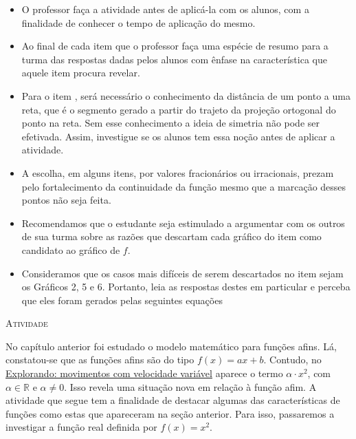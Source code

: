 \documentclass[10 pt,usenames,dvipsnames, oneside]{article}
\begin{document}
\begin{goals}
\begin{itemize}[itemsep=0pt]
\item O professor faça a atividade antes de aplicá-la com os alunos, com a finalidade de conhecer o tempo de aplicação do mesmo.
\item Ao final de cada item que o professor faça uma espécie de resumo para a turma das respostas dadas pelos alunos com ênfase na característica que aquele item procura revelar.
\item Para o item , será necessário o conhecimento da distância de um ponto a uma reta, que é o segmento gerado a partir do trajeto da projeção ortogonal do ponto na reta. Sem esse conhecimento a ideia de simetria não pode ser efetivada. Assim, investigue se os alunos tem essa noção antes de aplicar a atividade.
\item A escolha, em alguns itens, por valores fracionários ou irracionais, prezam pelo fortalecimento da continuidade da função mesmo que a marcação desses pontos não seja feita.
\item Recomendamos que o estudante seja estimulado a argumentar com os outros de sua turma sobre as razões que descartam cada gráfico do item  como candidato ao gráfico de $f$.
\item Consideramos que os casos mais difíceis de serem descartados no item  sejam os Gráficos 2, 5 e 6. Portanto, leia as respostas destes em particular e perceba que eles foram gerados pelas seguintes equações
\end{itemize}
\end{goals}

\bigskip
\begin{center}
{\large \scshape Atividade}
\end{center}
\fi

No capítulo anterior foi estudado o modelo matemático para funções afins. Lá, constatou-se que as funções afins são do tipo \(f(x)=ax+b\). Contudo, no \hyperref[\detokenize{AF209-0:sec-funcao-quadratica-movimento-com-velocidade-variavel-queda-vertical}]{Explorando: movimentos com velocidade variável} aparece o termo \(\alpha \cdot x^2\), com \(\alpha \in \mathbb{R}\) e \(\alpha \neq 0\). Isso revela uma situação nova em relação à função afim. A atividade que segue tem a finalidade de destacar algumas das características de funções como estas que apareceram na seção anterior. Para isso, passaremos a investigar a função real definida por \(f(x)=x^2\).
\end{document}
